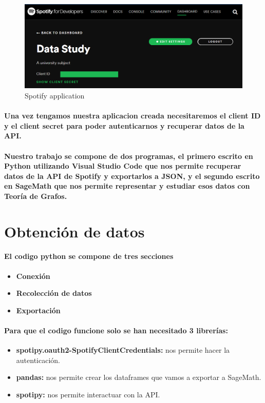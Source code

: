 \documentclass[11pt,spanish]{article}
\begin{document}
\begin{figure}[h!]
    \centering
	\includegraphics[width=120mm]{devoloper_spotify_1.png}
    \caption{Spotify application}\label{fig:app_spotify}
\end{figure}

\paragraph*{Una vez tengamos nuestra aplicacion creada necesitaremos el client ID y el client secret para poder autenticarnos 
y recuperar datos de la API.}

\paragraph*{Nuestro trabajo se compone de dos programas, el primero escrito en Python utilizando Visual Studio Code
que nos permite recuperar datos de la API de Spotify y exportarlos a JSON, y el segundo escrito en SageMath que nos permite representar y estudiar esos datos con Teoría de Grafos.}

\section{Obtención de datos}

\paragraph*{El codigo python se compone de tres secciones}
\begin{itemize}
	\item \textbf{Conexión}
	\item \textbf{Recolección de datos}
	\item \textbf{Exportación}
\end{itemize}

\paragraph*{Para que el codigo funcione solo se han necesitado 3 librerías:}
\begin{itemize}
	\item \textbf{spotipy.oauth2-SpotifyClientCredentials:} nos permite hacer la autenticación.
	\item \textbf{pandas:} nos permite crear los dataframes que vamos a exportar a SageMath.
	\item \textbf{spotipy:} nos permite interactuar con la API.
\end{itemize}
\end{document}
